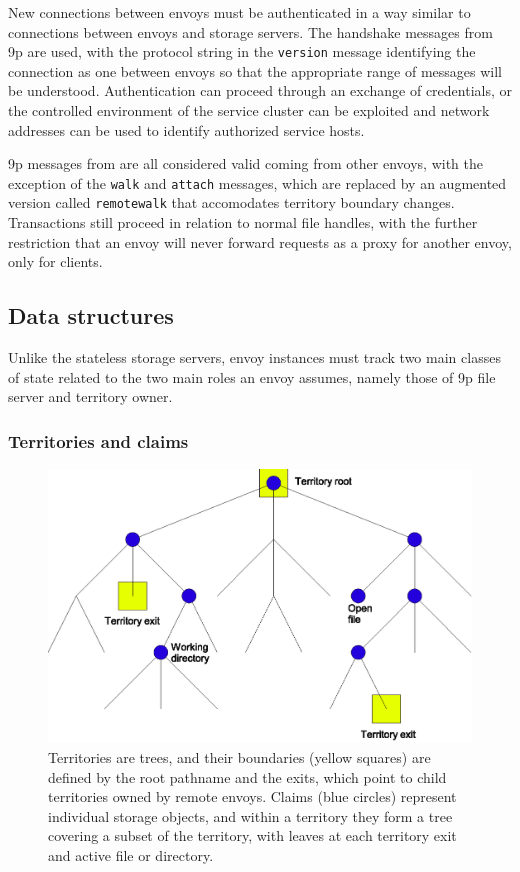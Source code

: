 New connections between envoys must be authenticated in a way similar to connections between envoys and storage servers. The handshake messages from 9p are used, with the protocol string in the \texttt{version} message identifying the connection as one between envoys so that the appropriate range of messages will be understood. Authentication can proceed through an exchange of credentials, or the controlled environment of the service cluster can be exploited and network addresses can be used to identify authorized service hosts.

9p messages from  are all considered valid coming from other envoys, with the exception of the \texttt{walk} and \texttt{attach} messages, which are replaced by an augmented version called \texttt{remotewalk} that accomodates territory boundary changes. Transactions still proceed in relation to normal file handles, with the further restriction that an envoy will never forward requests as a proxy for another envoy, only for clients.

\subsection{Data structures}

Unlike the stateless storage servers, envoy instances must track two main classes of state related to the two main roles an envoy assumes, namely those of 9p file server and territory owner.

\subsubsection{Territories and claims}

\begin{figure}[tp]
\centering
\includegraphics[width=.8\textwidth]{figures/territory-claims}
\caption[A territory managed by a single envoy]{Territories are trees, and their boundaries (yellow squares) are defined by the root pathname and the exits, which point to child territories owned by remote envoys. Claims (blue circles) represent individual storage objects, and within a territory they form a tree covering a subset of the territory, with leaves at each territory exit and active file or directory.}
\label{fig:territory-claims}
\end{figure}

